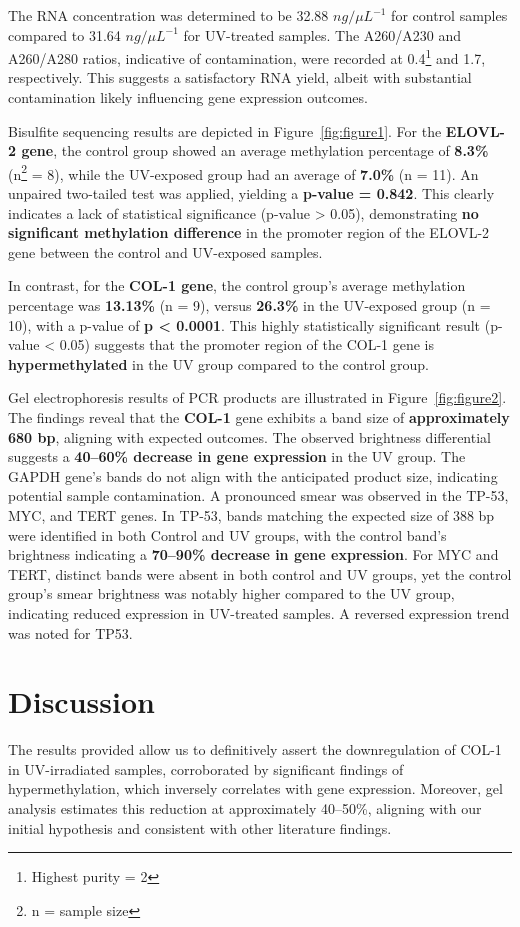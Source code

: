 \documentclass[letterpaper,11pt]{article}
\begin{document}
The RNA concentration was determined to be 32.88 $ng/\mu L^{-1}$ for control samples compared to 31.64 $ng/\mu L^{-1}$ for UV-treated samples. The A260/A230 and A260/A280 ratios, indicative of contamination, were recorded at 0.4\footnote{Highest purity = 2} and 1.7, respectively. This suggests a satisfactory RNA yield, albeit with substantial contamination likely influencing gene expression outcomes.

Bisulfite sequencing results are depicted in Figure~\ref{fig:figure1}. For the \textbf{ELOVL-2 gene}, the control group showed an average methylation percentage of \textbf{8.3\%} (n\footnote{n = sample size} = 8), while the UV-exposed group had an average of \textbf{7.0\%} (n = 11). An unpaired two-tailed test was applied, yielding a \textbf{p-value = 0.842}. This clearly indicates a lack of statistical significance (p-value > 0.05), demonstrating \textbf{no significant methylation difference} in the promoter region of the ELOVL-2 gene between the control and UV-exposed samples.

In contrast, for the \textbf{COL-1 gene}, the control group's average methylation percentage was \textbf{13.13\%} (n = 9), versus \textbf{26.3\%} in the UV-exposed group (n = 10), with a p-value of \textbf{p < 0.0001}. This highly statistically significant result (p-value < 0.05) suggests that the promoter region of the COL-1 gene is \textbf{hypermethylated} in the UV group compared to the control group.

Gel electrophoresis results of PCR products are illustrated in Figure~\ref{fig:figure2}. The findings reveal that the \textbf{COL-1} gene exhibits a band size of \textbf{approximately 680 bp}, aligning with expected outcomes. The observed brightness differential suggests a \textbf{40--60\% decrease in gene expression} in the UV group. The GAPDH gene's bands do not align with the anticipated product size, indicating potential sample contamination. A pronounced smear was observed in the TP-53, MYC, and TERT genes. In TP-53, bands matching the expected size of 388 bp were identified in both Control and UV groups, with the control band's brightness indicating a \textbf{70--90\% decrease in gene expression}. For MYC and TERT, distinct bands were absent in both control and UV groups, yet the control group's smear brightness was notably higher compared to the UV group, indicating reduced expression in UV-treated samples. A reversed expression trend was noted for TP53.

\newpage
\section{Discussion}
The results provided allow us to definitively assert the downregulation of COL-1 in UV-irradiated samples, corroborated by significant findings of hypermethylation, which inversely correlates with gene expression. Moreover, gel analysis estimates this reduction at approximately 40--50\%, aligning with our initial hypothesis and consistent with other literature findings.
\end{document}
